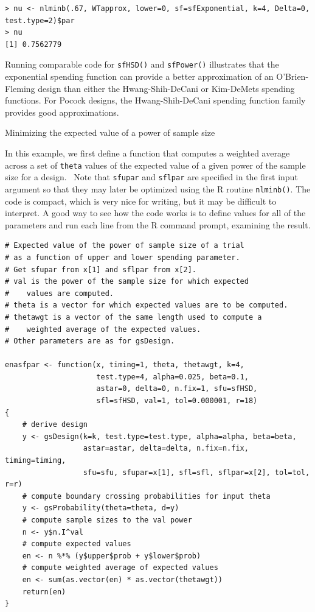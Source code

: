 \bigskip

\begin{verbatim}
> nu <- nlminb(.67, WTapprox, lower=0, sf=sfExponential, k=4, Delta=0, test.type=2)$par
> nu
[1] 0.7562779
\end{verbatim}
\bigskip

Running comparable code for \texttt{sfHSD()} and \texttt{sfPower()}
illustrates that the exponential spending function can provide a better
approximation of an O'Brien-Fleming design than either the Hwang-Shih-DeCani
or Kim-DeMets spending functions. For Pocock designs, the Hwang-Shih-DeCani
spending function family provides good approximations.

\begin{example}
\bigskip Minimizing the expected value of a power of sample size
\end{example}

In this example, we first define a function that computes a weighted average
across a set of \texttt{theta} values of the expected value of a given power
of the sample size for a design. \ Note that \texttt{sfupar} and
\texttt{sflpar} are specified in the first input argument so that they may later
be optimized using the R routine \texttt{nlminb()}. The code is compact, which
is very nice for writing, but it may be difficult to interpret. A good way to
see how the code works is to define values for all of the parameters and run
each line from the R command prompt, examining the result.

\bigskip

\begin{verbatim}
# Expected value of the power of sample size of a trial 
# as a function of upper and lower spending parameter. 
# Get sfupar from x[1] and sflpar from x[2].
# val is the power of the sample size for which expected
#    values are computed.
# theta is a vector for which expected values are to be computed.
# thetawgt is a vector of the same length used to compute a
#    weighted average of the expected values.
# Other parameters are as for gsDesign.

enasfpar <- function(x, timing=1, theta, thetawgt, k=4, 
                     test.type=4, alpha=0.025, beta=0.1, 
                     astar=0, delta=0, n.fix=1, sfu=sfHSD, 
                     sfl=sfHSD, val=1, tol=0.000001, r=18)
{
    # derive design
    y <- gsDesign(k=k, test.type=test.type, alpha=alpha, beta=beta,
                  astar=astar, delta=delta, n.fix=n.fix, timing=timing,
                  sfu=sfu, sfupar=x[1], sfl=sfl, sflpar=x[2], tol=tol, r=r)
    # compute boundary crossing probabilities for input theta
    y <- gsProbability(theta=theta, d=y)
    # compute sample sizes to the val power
    n <- y$n.I^val
    # compute expected values
    en <- n %*% (y$upper$prob + y$lower$prob)
    # compute weighted average of expected values
    en <- sum(as.vector(en) * as.vector(thetawgt))
    return(en)
}
\end{verbatim}
\bigskip


